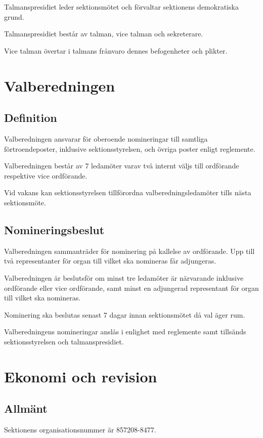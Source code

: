 \documentclass{styrdokument}
\begin{document}
\? Talmanspresidiet leder sektionsmötet och förvaltar sektionens demokratiska
grund.

\? Talmanspresidiet består av talman, vice talman och sekreterare.

\? Vice talman övertar i talmans frånvaro dennes befogenheter och plikter.

\section{Valberedningen}
\subsection{Definition}

\? Valberedningen ansvarar för oberoende nomineringar till samtliga förtroendeposter, inklusive sektionsstyrelsen, och övriga poster enligt reglemente.
  
\? Valberedningen består av 7 ledamöter varav två internt väljs till ordförande respektive vice ordförande.

\? Vid vakans kan sektionsstyrelsen tillförordna valberedningsledamöter tills nästa sektionsmöte.

\subsection{Nomineringsbeslut}

\? Valberedningen sammanträder för nominering på kallelse av ordförande.
Upp till två representanter för organ till vilket ska nomineras får adjungeras.

\? Valberedningen är beslutsför om minst tre ledamöter är närvarande inklusive ordförande eller vice ordförande, samt minst en adjungerad representant för organ till vilket ska nomineras.

\? Nominering ska beslutas senast 7 dagar innan sektionsmötet då val äger rum.

\? Valberedningens nomineringar anslås i enlighet med reglemente samt tillsänds sektionsstyrelsen och talmanspresidiet.

\section{Ekonomi och revision}
\subsection{Allmänt}

\? Sektionens organisationsnummer är 857208-8477.
\end{document}

